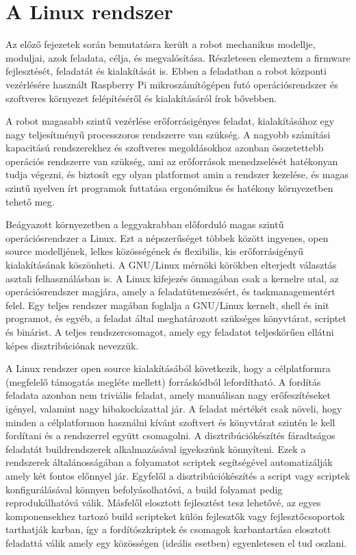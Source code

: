 \chapter{A Linux rendszer}

Az előző fejezetek során bemutatásra került a robot mechanikus modellje,
moduljai, azok feladata, célja, és megvalósítása. Részletesen elemeztem a
firmware fejlesztését, feladatát és kialakítását is. Ebben a feladatban a robot
központi vezérlésére használt Raspberry Pi mikroszámítógépen futó
operációsrendszer és szoftveres környezet felépítéséről és kialakításáról írok
bővebben.

\medskip

A robot magasabb szintű vezérlése erőforrásigényes feladat, kialakításához egy
nagy teljesítményű processzoros rendszerre van szükség.  A nagyobb számítási
kapacitású rendszerekhez és szoftveres megoldásokhoz azonban összetettebb
operációs rendszerre van szükség, ami az erőforrások menedzselését hatékonyan
tudja végezni, és biztosít egy olyan platformot amin a rendszer kezelése, és
magas szintű nyelven írt programok futtatása ergonómikus és hatékony környezetben
tehető meg.

Beágyazott környezetben a leggyakrabban előforduló magas szintű operációsrendszer
a Linux. Ezt a népszerűséget többek között ingyenes, open source modelljének,
lelkes közösségének és flexibilis, kis erőforrásigényű kialakításának köszönheti.
A GNU/Linux mérnöki körökben elterjedt választás asztali felhasználásban is. A
Linux kifejezés önmagában csak a kernelre utal, az operációsrendszer magjára,
amely a feladatütemezésért, és taskmanagementért felel. Egy teljes rendszer
magában foglalja a GNU/Linux kernelt, shell és init programot, és egyéb, a
feladat által meghatározott szükséges könyvtárat, scriptet és binárist. A teljes
rendszercsomagot, amely egy feladatot teljeskörűen ellátni képes disztribúciónak
nevezzük.

\medskip

A Linux rendszer open source kialakításából következik, hogy a célplatformra
(megfelelő támogatás megléte mellett) forráskódból lefordítható. A fordítás
feladata azonban nem triviális feladat, amely manuálisan nagy erőfeszítéseket
igényel, valamint nagy hibakockázattal jár. A feladat mértékét csak növeli, hogy
minden a célplatformon használni kívánt szoftvert és könyvtárat szintén le kell
fordítani és a rendszerrel együtt csomagolni. A disztribúciókészítés fáradtságos
feladatát buildrendszerek alkalmazásával igyekszünk könnyíteni. Ezek a rendszerek
általánosságában a folyamatot scriptek segítségével automatizálják amely két
fontos előnnyel jár. Egyfelől a disztribúciókészítés a script vagy scriptek
konfigurálásával könnyen befolyásolhatóvá, a build folyamat pedig
reprodukálhatóvá válik. Másfelől elosztott fejlesztést tesz lehetővé, az egyes
komponensekhez tartozó build scripteket külön fejlesztők vagy fejlesztőcsoportok
tarthatják karban, így a fordítószkriptek és csomagok karbantartása elosztott
feladattá válik amely egy közösségen (ideális esetben) egyenletesen el tud
oszlani. 


